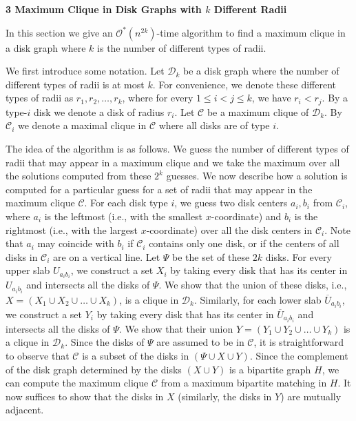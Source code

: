 \par
\par
\par
\par\medskip\noindent\textbf{3 Maximum Clique in Disk Graphs with $k$ Different Radii}\par
In this section we give an $\mathcal{O}^{*}(n^{2k})$-time algorithm to find a maximum clique in a disk graph where $k$ is the number of different types of radii.
\par
\par
We first introduce some notation. Let $\mathcal{D}_{k}$ be a disk graph where the number of different types of radii is at most $k$. For convenience, we denote these different types of radii as $r_{1},r_{2},\ldots,r_{k}$, where for every $1\leq i<j\leq k$, we have $r_{i}<r_{j}$. By a type-$i$ disk we denote a disk of radius $r_{i}$. Let $\mathcal{C}$ be a maximum clique of $\mathcal{D}_{k}$. By $\mathcal{C}_{i}$ we denote a maximal clique in $\mathcal{C}$ where all disks are of type $i$.
\par
\par
The idea of the algorithm is as follows. We guess the number of different types of radii that may appear in a maximum clique and we take the maximum over all the solutions computed from these $2^{k}$ guesses. We now describe how a solution is computed for a particular guess for a set of radii that may appear in the maximum clique $\mathcal{C}$. For each disk type $i$, we guess two disk centers $a_{i},b_{i}$ from $\mathcal{C}_{i}$, where $a_{i}$ is the leftmost (i.e., with the smallest $x$-coordinate) and $b_{i}$ is the rightmost (i.e., with the largest $x$-coordinate) over all the disk centers in $\mathcal{C}_{i}$. Note that $a_{i}$ may coincide with $b_{i}$ if $\mathcal{C}_{i}$ contains only one disk, or if the centers of all disks in $\mathcal{C}_{i}$ are on a vertical line. Let $\Psi$ be the set of these $2k$ disks. For every upper slab $U_{a_{i}b_{i}}$, we construct a set $X_{i}$ by taking every disk that has its center in $U_{a_{i}b_{i}}$ and intersects all the disks of $\Psi$. We show that the union of these disks, i.e., $X=(X_{1}\cup X_{2}\cup\ldots\cup X_{k})$, is a clique in $\mathcal{D}_{k}$. Similarly, for each lower slab $\overline{U}_{a_{i}b_{i}}$, we construct a set $Y_{i}$ by taking every disk that has its center in $\overline{U}_{a_{i}b_{i}}$ and intersects all the disks of $\Psi$. We show that their union $Y=(Y_{1}\cup Y_{2}\cup\ldots\cup Y_{k})$ is a clique in $\mathcal{D}_{k}$. Since the disks of $\Psi$ are assumed to be in $\mathcal{C}$, it is straightforward to observe that $\mathcal{C}$ is a subset of the disks in $(\Psi\cup X\cup Y)$. Since the complement of the disk graph determined by the disks $(X\cup Y)$ is a bipartite graph $H$, we can compute the maximum clique $\mathcal{C}$ from a maximum bipartite matching in $H$. It now suffices to show that the disks in $X$ (similarly, the disks in $Y$) are mutually adjacent.
